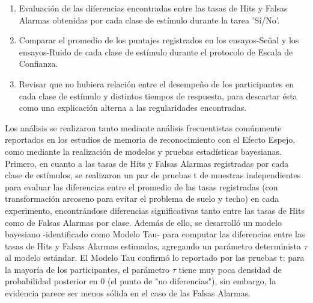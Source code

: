 \begin{enumerate}
	\item Evaluación de las diferencias encontradas entre las tasas de Hits y Falsas Alarmas obtenidas por cada clase de estímulo durante la tarea 'Sí/No'.\\
	\item Comparar el promedio de los puntajes registrados en los ensayos-Señal y los ensayos-Ruido de cada clase de estímulo durante el protocolo de Escala de Confianza.\\
	\item Revisar que no hubiera relación entre el desempeño de los participantes en cada clase de estímulo y distintos tiempos de respuesta, para descartar ésta como una explicación alterna a las regularidades encontradas.\\
\end{enumerate}

Los análisis se realizaron tanto mediante análisis frecuentistas comúnmente reportados en los estudios de memoria de reconocimiento con el Efecto Espejo, como mediante la realización de modelos y pruebas estadísticas bayesianas.\\

Primero, en cuanto a las tasas de Hits y Falsas Alarmas registradas por cada clase de estímulos, se realizaron un par de pruebas t de muestras independientes para evaluar las diferencias entre el promedio de las tasas registradas (con transformación arcoseno para evitar el problema de suelo y techo) en cada experimento, encontrándose diferencias significativas tanto entre las tasas de Hits como de Falsas Alarmas por clase. Además de ello, se desarrolló un modelo bayesiano -identificado como Modelo Tau- para computar las diferencias entre las tasas de Hits y Falsas Alarmas estimadas, agregando un parámetro determinista $\tau$ al modelo estándar. El Modelo Tau confirmó lo reportado por las pruebas t: para la mayoría de los participantes, el parámetro $\tau$ tiene muy poca densidad de probabilidad posterior en $0$ (el punto de "no diferencias"), sin embargo, la evidencia parece ser menos sólida en el caso de las Falsas Alarmas. \\ %


